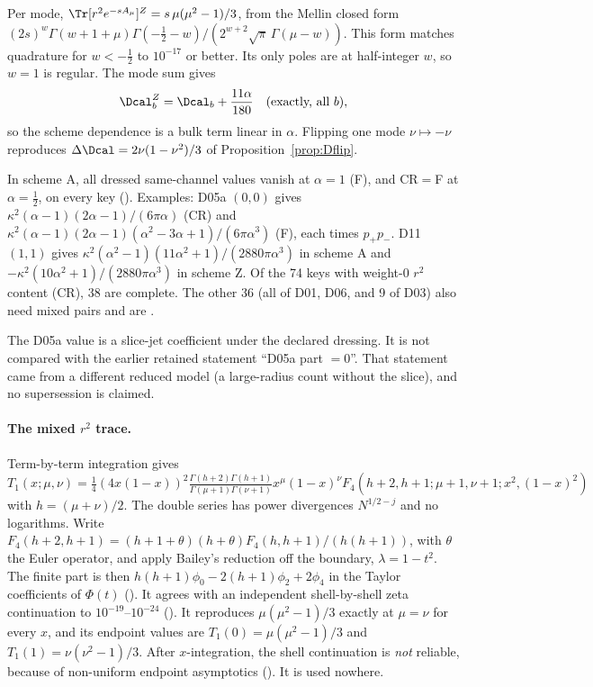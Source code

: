 \begin{proposition}
\label{prop:v10Z}
Per mode, \(\Tr[r^2e^{-sA_\mu}]^Z=s\,\mu(\mu^2-1)/3\), from the
Mellin closed form
\((2s)^w\Gamma(w+1+\mu)\Gamma(-\tfrac12-w)/(2^{w+2}\sqrt\pi\,\Gamma(\mu-w))\).
This form matches quadrature for \(w<-\tfrac12\) to \(10^{-17}\) or
better. Its only poles are at half-integer \(w\), so \(w=1\) is
regular. The mode sum gives
\[
 \Dcal^Z_b=\Dcal_b+\frac{11\alpha}{180}\quad\text{(exactly, all }b),
\]
so the scheme dependence is a bulk term linear in \(\alpha\). Flipping one mode
\(\nu\mapsto-\nu\) reproduces \(\Delta\Dcal=2\nu(1-\nu^2)/3\) of
Proposition~\ref{prop:Dflip}.
\end{proposition}

\begin{proposition}
\label{prop:v10dressed}
In scheme A, all dressed same-channel values vanish at \(\alpha=1\)
(F), and CR\(=\)F at \(\alpha=\tfrac12\), on every key
(). Examples:
D05a \((0,0)\) gives
\(\kappa^2(\alpha-1)(2\alpha-1)/(6\pi\alpha)\) (CR) and
\(\kappa^2(\alpha-1)(2\alpha-1)(\alpha^2-3\alpha+1)/(6\pi\alpha^3)\) (F),
each times \(p_+p_-\). D11 \((1,1)\) gives
\(\kappa^2(\alpha^2-1)(11\alpha^2+1)/(2880\pi\alpha^3)\) in scheme A
and \(-\kappa^2(10\alpha^2+1)/(2880\pi\alpha^3)\) in scheme Z. Of the
74 keys with weight-0 \(r^2\) content (CR), 38 are complete. The
other 36 (all of D01, D06, and 9 of D03) also need mixed pairs and
are \PARTIAL.
\end{proposition}
The D05a value is a slice-jet coefficient under the declared
dressing. It is not compared with the earlier retained statement
``D05a part \(=0\)''. That statement came from a different reduced
model (a large-radius count without the slice), and no
supersession is claimed.

\paragraph{The mixed \(r^2\) trace.}
Term-by-term integration gives
\[
 T_1(x;\mu,\nu)=\tfrac14(4x(1-x))^2\tfrac{\Gamma(h+2)\Gamma(h+1)}{\Gamma(\mu+1)\Gamma(\nu+1)}x^\mu(1-x)^\nu
 F_4(h+2,h+1;\mu+1,\nu+1;x^2,(1-x)^2)
\]
with \(h=(\mu+\nu)/2\). The double series has power divergences
\(N^{1/2-j}\) and no logarithms. Write \(F_4(h+2,h+1)=(h+1+\theta)(h+\theta)F_4(h,h+1)/(h(h+1))\), with \(\theta\) the
Euler operator, and apply Bailey's reduction \cite{BaileyF4} off the boundary,
\(\lambda=1-t^2\). The finite part is then
\(h(h+1)\phi_0-2(h+1)\phi_2+2\phi_4\) in the Taylor coefficients
of \(\Phi(t)\) (). It agrees with an
independent shell-by-shell zeta continuation to
\(10^{-19}\)--\(10^{-24}\) (). It
reproduces \(\mu(\mu^2-1)/3\) exactly at \(\mu=\nu\) for every
\(x\), and its endpoint values are \(T_1(0)=\mu(\mu^2-1)/3\) and
\(T_1(1)=\nu(\nu^2-1)/3\). After \(x\)-integration, the shell
continuation is \emph{not} reliable, because of non-uniform
endpoint asymptotics (). It is used
nowhere.

